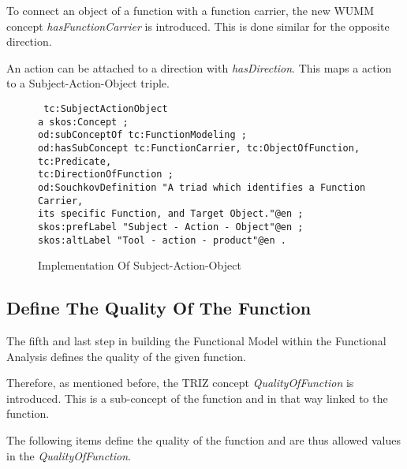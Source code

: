 To connect an object of a function with a function carrier, the new WUMM concept \textit{hasFunctionCarrier} is introduced.
This is done similar for the opposite direction.

An action can be attached to a direction with \textit{hasDirection}.
This maps a action to a Subject-Action-Object triple.

\begin{figure}[h]
    \centering
    \begin{code}\tt
        tc:SubjectActionObject\\
        \> a skos:Concept ;\\
        \> od:subConceptOf tc:FunctionModeling ;\\
        \> od:hasSubConcept tc:FunctionCarrier, tc:ObjectOfFunction, tc:Predicate,\\
        \> \> tc:DirectionOfFunction ;\\
        \> od:SouchkovDefinition "A triad which identifies a Function Carrier,\\
        \> \> its specific Function, and Target Object."@en ;\\
        \> skos:prefLabel "Subject - Action - Object"@en ;\\
        \> skos:altLabel "Tool - action - product"@en .
    \end{code}
    \caption{Implementation Of Subject-Action-Object}
    \label{fig:implementation_subject_action_object}
\end{figure}

\subsection{Define The Quality Of The Function}
\label{subsec:quality_function}

The fifth and last step in building the Functional Model within the Functional Analysis defines the quality of the given function.

Therefore, as mentioned before, the TRIZ concept \textit{QualityOfFunction} is introduced. 
This is a sub-concept of the function and in that way linked to the function.

The following items define the quality of the function and are thus allowed values in the \textit{QualityOfFunction}.

